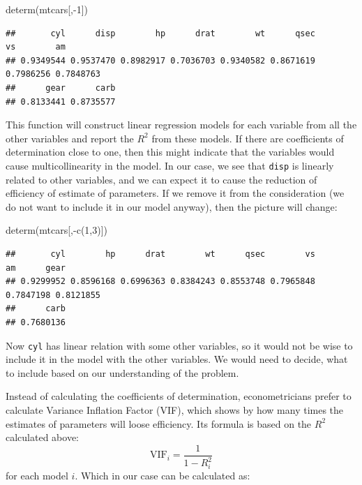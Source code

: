 \documentclass[
]{book}
\newenvironment{Shaded}{\begin{snugshade}}{\end{snugshade}}
\newcommand{\DecValTok}[1]{\textcolor[rgb]{0.00,0.00,0.81}{#1}}
\newcommand{\FunctionTok}[1]{\textcolor[rgb]{0.00,0.00,0.00}{#1}}
\newcommand{\NormalTok}[1]{#1}
\newcommand{\SpecialCharTok}[1]{\textcolor[rgb]{0.00,0.00,0.00}{#1}}
\theoremstyle{definition}
\theoremstyle{definition}
\theoremstyle{definition}
\theoremstyle{definition}
\theoremstyle{remark}
\begin{document}
\begin{Shaded}
\begin{Highlighting}[]
\FunctionTok{determ}\NormalTok{(mtcars[,}\SpecialCharTok{{-}}\DecValTok{1}\NormalTok{])}
\end{Highlighting}
\end{Shaded}

\begin{verbatim}
##       cyl      disp        hp      drat        wt      qsec        vs        am 
## 0.9349544 0.9537470 0.8982917 0.7036703 0.9340582 0.8671619 0.7986256 0.7848763 
##      gear      carb 
## 0.8133441 0.8735577
\end{verbatim}

This function will construct linear regression models for each variable from all the other variables and report the \(R^2\) from these models. If there are coefficients of determination close to one, then this might indicate that the variables would cause multicollinearity in the model. In our case, we see that \texttt{disp} is linearly related to other variables, and we can expect it to cause the reduction of efficiency of estimate of parameters. If we remove it from the consideration (we do not want to include it in our model anyway), then the picture will change:

\begin{Shaded}
\begin{Highlighting}[]
\FunctionTok{determ}\NormalTok{(mtcars[,}\SpecialCharTok{{-}}\FunctionTok{c}\NormalTok{(}\DecValTok{1}\NormalTok{,}\DecValTok{3}\NormalTok{)])}
\end{Highlighting}
\end{Shaded}

\begin{verbatim}
##       cyl        hp      drat        wt      qsec        vs        am      gear 
## 0.9299952 0.8596168 0.6996363 0.8384243 0.8553748 0.7965848 0.7847198 0.8121855 
##      carb 
## 0.7680136
\end{verbatim}

Now \texttt{cyl} has linear relation with some other variables, so it would not be wise to include it in the model with the other variables. We would need to decide, what to include based on our understanding of the problem.

Instead of calculating the coefficients of determination, econometricians prefer to calculate Variance Inflation Factor (VIF), which shows by how many times the estimates of parameters will loose efficiency. Its formula is based on the \(R^2\) calculated above:
\begin{equation*}
  \mathrm{VIF}_i = \frac{1}{1-R_i^2}
\end{equation*}
for each model \(i\). Which in our case can be calculated as:
\end{document}
